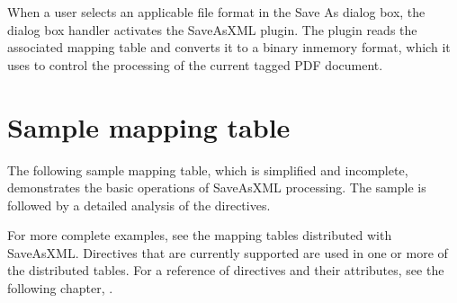 \documentclass[letterpaper,12pt,english,openany,oneside]{sphinxmanual}
\begin{document}
When a user selects an applicable file format in the Save As dialog box, the dialog box handler activates the SaveAsXML plug\sphinxhyphen{}in. The plug\sphinxhyphen{}in reads the associated mapping table and converts it to a binary in\sphinxhyphen{}memory format, which it uses to control the processing of the current tagged PDF document.


\section{Sample mapping table}
\label{\detokenize{index:sample-mapping-table}}
The following sample mapping table, which is simplified and incomplete, demonstrates the basic operations of SaveAsXML processing. The sample is followed by a detailed analysis of the directives.

For more complete examples, see the mapping tables distributed with SaveAsXML. Directives that are currently supported are used in one or more of the distributed tables. For a reference of directives and their attributes, see the following chapter, .
\end{document}
